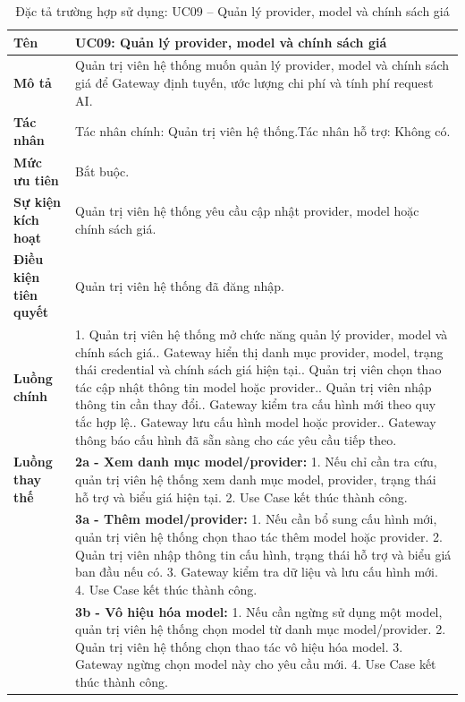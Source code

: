 \begin{longtable}{|L{4.2cm}|L{9.5cm}|}
\caption[Đặc tả UC09]{Đặc tả trường hợp sử dụng: UC09 -- Quản lý provider, model và chính sách giá} \\\hline
\textbf{Tên} & UC09: Quản lý provider, model và chính sách giá \\\hline
\textbf{Mô tả} & Quản trị viên hệ thống muốn quản lý provider, model và chính sách giá để Gateway định tuyến, ước lượng chi phí và tính phí request AI.\\\hline
\textbf{Tác nhân} & Tác nhân chính: Quản trị viên hệ thống.\newline Tác nhân hỗ trợ: Không có.\\\hline
\textbf{Mức ưu tiên} & Bắt buộc.\\\hline
\textbf{Sự kiện kích hoạt} & Quản trị viên hệ thống yêu cầu cập nhật provider, model hoặc chính sách giá.\\\hline
\textbf{Điều kiện tiên quyết} & Quản trị viên hệ thống đã đăng nhập.\\\hline
\textbf{Luồng chính} &
1. Quản trị viên hệ thống mở chức năng quản lý provider, model và chính sách giá.. Gateway hiển thị danh mục provider, model, trạng thái credential và chính sách giá hiện tại.. Quản trị viên chọn thao tác cập nhật thông tin model hoặc provider.. Quản trị viên nhập thông tin cần thay đổi.. Gateway kiểm tra cấu hình mới theo quy tắc hợp lệ.. Gateway lưu cấu hình model hoặc provider.. Gateway thông báo cấu hình đã sẵn sàng cho các yêu cầu tiếp theo.\\\hline
\textbf{Luồng thay thế} &
\textbf{2a - Xem danh mục model/provider:} 1. Nếu chỉ cần tra cứu, quản trị viên hệ thống xem danh mục model, provider, trạng thái hỗ trợ và biểu giá hiện tại. 2. Use Case kết thúc thành công.\\\hline
&
\textbf{3a - Thêm model/provider:} 1. Nếu cần bổ sung cấu hình mới, quản trị viên hệ thống chọn thao tác thêm model hoặc provider. 2. Quản trị viên nhập thông tin cấu hình, trạng thái hỗ trợ và biểu giá ban đầu nếu có. 3. Gateway kiểm tra dữ liệu và lưu cấu hình mới. 4. Use Case kết thúc thành công.\\\hline
&
\textbf{3b - Vô hiệu hóa model:} 1. Nếu cần ngừng sử dụng một model, quản trị viên hệ thống chọn model từ danh mục model/provider. 2. Quản trị viên hệ thống chọn thao tác vô hiệu hóa model. 3. Gateway ngừng chọn model này cho yêu cầu mới. 4. Use Case kết thúc thành công.\\\hline

\end{longtable}
